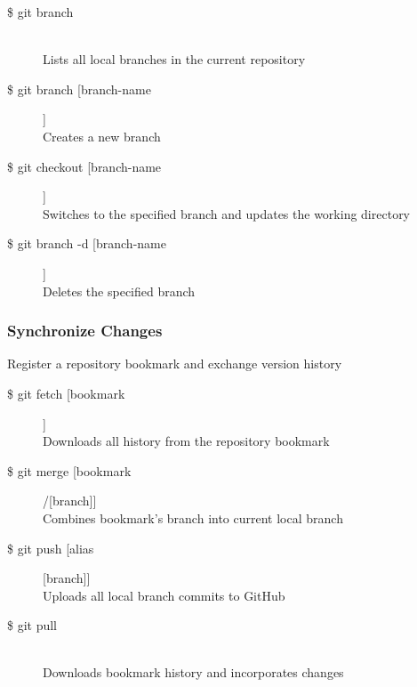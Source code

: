 \begin{description}

\item [\$ git branch] \leavevmode \\
Lists all local branches in the current repository

\item [\$ git branch [branch-name]]\\
Creates a new branch

\item [\$ git checkout [branch-name]]\\
Switches to the specified branch and updates the working directory

\item [\$ git branch -d [branch-name]]\\
Deletes the specified branch\\

\end{description}


\subsubsection{Synchronize Changes}
Register a repository bookmark and exchange version history

\begin{description}

\item [\$ git fetch [bookmark]]\\
Downloads all history from the repository bookmark

\item [\$ git merge [bookmark]/[branch]]\\
Combines bookmark’s branch into current local branch

\item [\$ git push [alias][branch]]\\
Uploads all local branch commits to GitHub

\item [\$ git pull] \leavevmode \\
Downloads bookmark history and incorporates changes

\end{description}


